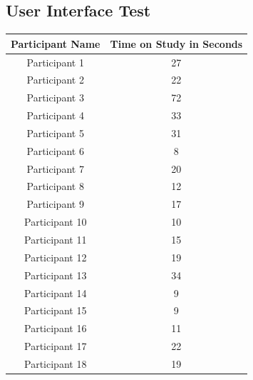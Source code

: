 \subsection*{User Interface Test}\label{appendix:heatmapTimes}

\begin{table}[htbp]
    \centering
    \begin{tabular}{|c|c|}
    \hline
    \textbf{Participant Name} & \textbf{Time on Study in Seconds} \\ \hline
    Participant 1             & 27                                \\ \hline
    Participant 2             & 22                                \\ \hline
    Participant 3             & 72                                \\ \hline
    Participant 4             & 33                                \\ \hline
    Participant 5             & 31                                \\ \hline
    Participant 6             & 8                                \\ \hline
    Participant 7             & 20                                \\ \hline
    Participant 8             & 12                                \\ \hline
    Participant 9             & 17                                \\ \hline
    Participant 10             & 10                                \\ \hline
    Participant 11             & 15                                \\ \hline
    Participant 12             & 19                                \\ \hline
    Participant 13             & 34                                \\ \hline
    Participant 14             & 9                                \\ \hline
    Participant 15             & 9                                \\ \hline
    Participant 16             & 11                                \\ \hline
    Participant 17             & 22                                \\ \hline
    Participant 18             & 19                                \\ \hline

\end{tabular}
\end{table}

